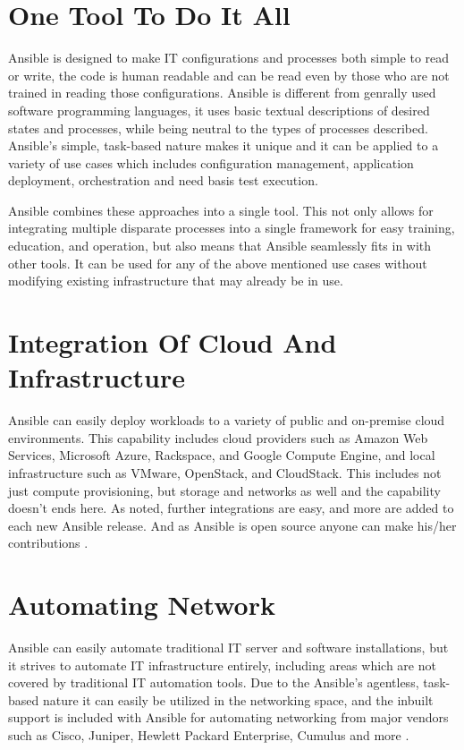 \documentclass[9pt,twocolumn,twoside]{../../styles/osajnl}
\begin{document}
\section{One Tool To Do It All}

Ansible is designed to make IT configurations and processes both
simple to read or write, the code is human readable and can be read
even by those who are not trained in reading those
configurations. Ansible is different from genrally used software
programming languages, it uses basic textual descriptions of desired
states and processes, while being neutral to the types of processes
described. Ansible’s simple, task-based nature makes it unique and it
can be applied to a variety of use cases which includes configuration
management, application deployment, orchestration and need basis test
execution.

Ansible combines these approaches into a single tool. This not only
allows for integrating multiple disparate processes into a single
framework for easy training, education, and operation, but also means
that Ansible seamlessly fits in with other tools. It can be used for
any of the above mentioned use cases without modifying existing
infrastructure that may already be in use.

\section{Integration Of Cloud And Infrastructure}

Ansible can easily deploy workloads to a variety of public and
on-premise cloud environments. This capability includes cloud
providers such as Amazon Web Services, Microsoft Azure, Rackspace, and
Google Compute Engine, and local infrastructure such as VMware,
OpenStack, and CloudStack. This includes not just compute
provisioning, but storage and networks as well and the capability
doesn't ends here. As noted, further integrations are easy, and more
are added to each new Ansible release. And as Ansible is open source
anyone can make his/her contributions \cite{www-ansible}.

\section{Automating Network}

Ansible can easily automate traditional IT server and software
installations, but it strives to automate IT infrastructure entirely,
including areas which are not covered by traditional IT automation
tools. Due to the Ansible’s agentless, task-based nature it can easily
be utilized in the networking space, and the inbuilt support is
included with Ansible for automating networking from major vendors
such as Cisco, Juniper, Hewlett Packard Enterprise, Cumulus and
more \cite{www-ansible3}.
\end{document}
